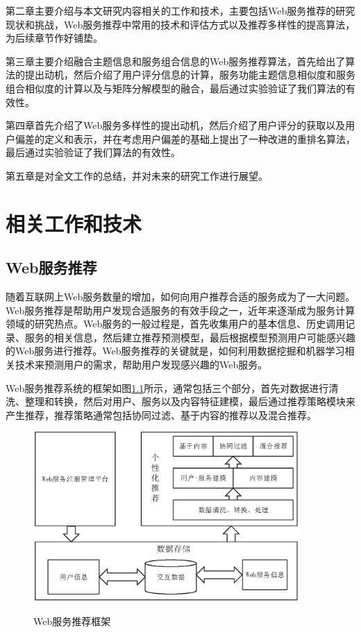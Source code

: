 \documentclass[master,winfonts]{njuthesis}
\begin{document}
第二章主要介绍与本文研究内容相关的工作和技术，主要包括Web服务推荐的研究现状和挑战，Web服务推荐中常用的技术和评估方式以及推荐多样性的提高算法，为后续章节作好铺垫。

第三章主要介绍融合主题信息和服务组合信息的Web服务推荐算法，首先给出了算法的提出动机，然后介绍了用户评分信息的计算，服务功能主题信息相似度和服务组合相似度的计算以及与矩阵分解模型的融合，最后通过实验验证了我们算法的有效性。

第四章首先介绍了Web服务多样性的提出动机，然后介绍了用户评分的获取以及用户偏差的定义和表示，并在考虑用户偏差的基础上提出了一种改进的重排名算法，最后通过实验验证了我们算法的有效性。

第五章是对全文工作的总结，并对未来的研究工作进行展望。

\chapter{相关工作和技术}\label{chapter_relatework}
\section{Web服务推荐}
随着互联网上Web服务数量的增加，如何向用户推荐合适的服务成为了一大问题。Web服务推荐是帮助用户发现合适服务的有效手段之一，近年来逐渐成为服务计算领域的研究热点。Web服务的一般过程是，首先收集用户的基本信息、历史调用记录、服务的相关信息，然后建立推荐预测模型，最后根据模型预测用户可能感兴趣的Web服务进行推荐。Web服务推荐的关键就是，如何利用数据挖掘和机器学习相关技术来预测用户的需求，帮助用户发现感兴趣的Web服务。

Web服务推荐系统的框架如图\ref{2-1}所示，通常包括三个部分，首先对数据进行清洗、整理和转换，然后对用户、服务以及内容特征建模，最后通过推荐策略模块来产生推荐，推荐策略通常包括协同过滤、基于内容的推荐以及混合推荐。
\begin{figure}[htbp]
  \centering
  \includegraphics[width=0.9\textwidth]{2-1.eps}\\
  \caption{Web服务推荐框架}\label{2-1}
\end{figure}
\end{document}
